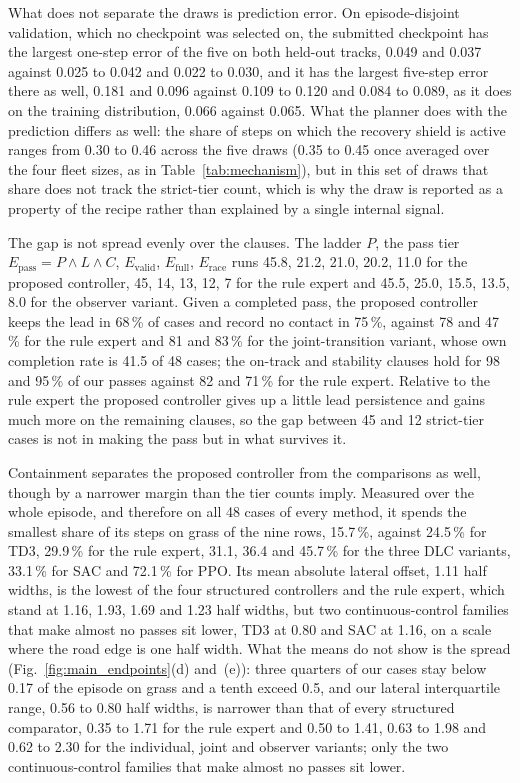 \documentclass[journal]{IEEEtran}
\begin{document}
What does not separate the draws is prediction error. On episode-disjoint
validation, which no checkpoint was selected on, the submitted checkpoint has the
largest one-step error of the five on both held-out tracks, 0.049 and 0.037
against 0.025 to 0.042 and 0.022 to 0.030, and it has the largest five-step
error there as well, 0.181 and 0.096 against 0.109 to 0.120 and 0.084 to 0.089,
as it does on the training distribution, 0.066 against 0.065. What the planner
does with the prediction differs as well: the share of steps on which the
recovery shield is active ranges from 0.30 to 0.46 across the five draws (0.35
to 0.45 once averaged over the four fleet sizes, as in
Table~\ref{tab:mechanism}), but in this set of draws that share does not track
the strict-tier count, which is why the draw is reported as a property of the
recipe rather than explained by a single internal signal.


The gap is not spread evenly over the clauses. The ladder $P$, the pass tier
$E_{\mathrm{pass}}=P\wedge L\wedge C$, $E_{\mathrm{valid}}$, $E_{\mathrm{full}}$,
$E_{\mathrm{race}}$ runs 45.8, 21.2, 21.0, 20.2, 11.0 for the proposed
controller, 45, 14, 13, 12, 7 for the rule expert and 45.5, 25.0, 15.5, 13.5,
8.0 for the observer variant. Given a completed pass, the proposed controller
keeps the lead in
68\,\% of cases and record no contact in 75\,\%, against 78 and 47\,\% for the
rule expert and 81 and 83\,\% for the joint-transition variant, whose own
completion rate is 41.5 of 48 cases; the on-track and stability clauses hold for
98 and 95\,\% of our passes against 82 and 71\,\% for the rule expert. Relative
to the rule expert the proposed controller gives up a little lead persistence
and gains much more on the remaining clauses, so the gap between 45 and 12
strict-tier cases is not in making the pass but in what survives it.


Containment separates the proposed controller from the comparisons as well,
though by a narrower margin than the tier counts imply. Measured over the whole
episode, and therefore on all 48 cases of every method, it spends the smallest
share of its steps on grass of the nine rows, 15.7\,\%, against 24.5\,\% for
TD3, 29.9\,\% for the rule expert, 31.1, 36.4 and 45.7\,\% for the three DLC
variants, 33.1\,\% for SAC and 72.1\,\% for PPO. Its mean absolute lateral
offset, 1.11 half widths, is the lowest of the four structured controllers and
the rule expert, which stand at 1.16, 1.93, 1.69 and 1.23 half widths, but two
continuous-control families that make almost no passes sit lower, TD3 at 0.80
and SAC at 1.16, on a scale where the road edge is one half width. What the
means do not show is the spread (Fig.~\ref{fig:main_endpoints}(d) and~(e)):
three quarters of our cases stay below 0.17 of the episode on grass and a tenth
exceed 0.5, and our lateral interquartile range, 0.56 to 0.80 half widths, is
narrower than that of every structured comparator, 0.35 to 1.71 for the rule
expert and 0.50 to 1.41, 0.63 to 1.98 and 0.62 to 2.30 for the individual, joint
and observer variants; only the two continuous-control families that make almost
no passes sit lower.
\end{document}

